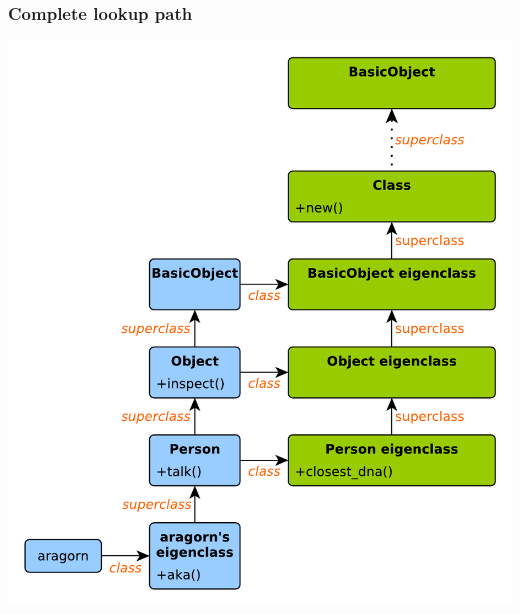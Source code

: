 \begin{frame}\frametitle{Complete lookup path}
\begin{center}
\includegraphics[scale=0.42]{diagrams/complete_lookup_path.pdf}
\end{center}
\end{frame}




